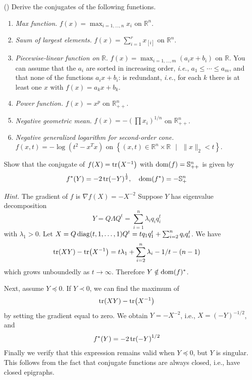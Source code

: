 \begin{problem}[3.36]
    (\todo)
    Derive the conjugates of the following funetions.
    \begin{enumerate}
        \item \textit{Max function.} $f(x) = \max_{i = 1,\dots,n}x_i$ on $\mathbb{R}^n$.
        \item \textit{Saum of largest elements.} $f(x) = \sum_{i = 1}^r x_{[i]}$ on $\mathbb{R}^n$.
        \item \textit{Piecewise-linear function on} $\mathbb{R}$. $f(x) = \max_{i = 1, \dots, m}(a_ix + b_i)$ on $\mathbb{R}$. You can assume that the $a_i$ are sorted in increasing order, \textit{i.e.}, $a_1 \le \cdots \le a_m$, and that none of the functions $a_ix + b_i$: is redundant, \textit{i.e.}, for each $k$ there is at least one $x$ with $f(x) = a_kx + b_k$.
        \item \textit{Power function.} $f(x) = x^p$ on $\mathbb{R}_{++}^n$.
        \item \textit{Negative geometric mean.} $f(x) = -\left(\prod x_i\right)^{1 / n}$ on $\mathbb{R}_{++}^n$.
        \item \textit{Negative generalized logarithm for second-order cone.} $f(x, t) = -\log(t^2 - x^Tx)$ on $\left\{(x, t) \in \mathbb{R}^n\times \mathbb{R}\text{\ } |\text{\ } \|x\|_2 < t\right\}$.
    \end{enumerate}
\end{problem}

\begin{problem}[3.37]
    Show that the conjugate of $f(X) = \tr(X^{-1})$ with $\operatorname{dom}(f) = \mathbb{S}^n_{++}$ is given by\[f^*(Y) = -2\tr(-Y)^{\frac{1}{2}}, \quad \operatorname{dom}(f^*) = -\mathbb{S}_+^n\]

    \textit{Hint.} The gradient of $f$ is $\nabla f(X) = -X^{-2}$
    \Answer Suppose $Y$ has eigenvalue decomposition \[Y = Q\Lambda Q^t = \sum_{i = 1}^n \lambda_i q_i q_i^t\] with $\lambda_1 > 0$. Let $X = Q \operatorname{diag}(t, 1, \dots, 1)Q^t = tq_1q_1^t + \sum_{i = 2}^{n}q_iq_i^t$. We have \[\tr(XY) - \tr(X^{-1}) = t\lambda_1 + \sum_{i = 2}^n\lambda_i - 1 / t - (n - 1)\] which grows unboundedly as $t \to \infty$. Therefore $Y \notin \operatorname{dom}(f)^*$.

    Next, assume $Y \preceq 0$. If $Y \prec 0$, we can find the maximum of \[\tr(XY) - \tr(X^{-1})\] by setting the gradient equal to zero. We obtain $Y = -X^{-2}$, i.e., $X = (-Y)^{-1 / 2}$, and \[f^*(Y) = -2\tr(-Y)^{1 / 2}\]Finally we verify that this expression remains valid when $Y \preceq 0$, but $Y$ is singular. This follows from the fact that conjugate functions are always closed, i.e., have closed epigraphs.
\end{problem}

